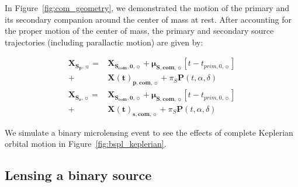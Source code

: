 \documentclass[twocolumn]{aastex701}
\newcommand{\vect}[1]{\boldsymbol{#1}}
\newcommand{\tnot}{t_{0,\sun}}
\newcommand{\thetaE}{\theta_E}
\newcommand{\uo}{u_{0,\sun}}
\newcommand{\uocom}{u_{com, 0,\sun}}
\newcommand{\mussysvec}{\vect{\mu}_{\boldsymbol{S, com},\sun}}
\newcommand{\Xsovec}{\vect{X}_{\boldsymbol{S,0},\sun}}
\newcommand{\Xscomvec}{\vect{X}_{\boldsymbol{S_{com},0},\sun}}
\newcommand{\Xspvec}{\vect{X}_{\boldsymbol{S_p},\sun}}
\newcommand{\Xcomp}{\vect{X(t)}_{\boldsymbol{p},\boldsymbol{com},\sun}}
\newcommand{\Xcoms}{\vect{X(t)}_{\boldsymbol{s},\boldsymbol{com},\sun}}
\newcommand{\Xssvec}{\vect{X}_{\boldsymbol{S_s},\sun}}
\newcommand{\tpnot}{t_{prim,0,\sun}}
\newcommand{\tcomnot}{t_{com,0,\sun}}
\newcommand{\al}{\aleph_{pri}}
\newcommand{\ala}{\aleph_{sec}}
\begin{document}



In Figure~\ref{fig:com_geometry}, we demonstrated the motion of the primary and its secondary companion around the center of mass at rest. After accounting for the proper motion of the center of mass, the primary and secondary source trajectories (including parallactic motion) are given by: 



\begin{align}
    \Xspvec =& \Xscomvec + \mussysvec  [t - \tpnot] \nonumber \\
    +& \Xcomp + \pi_S \vect{P}(t, \alpha, \delta) \\
    \Xssvec =& \Xscomvec + \mussysvec [t - \tpnot] \nonumber \\
    +& \Xcoms + \pi_S \vect{P}(t, \alpha, \delta) 
\end{align}

We simulate a binary microlensing event to see the effects of complete Keplerian orbital motion in Figure~\ref{fig:bspl_keplerian}. 

\subsection{Lensing a binary source}
\label{sec:binsources_eqn}
\end{document}
